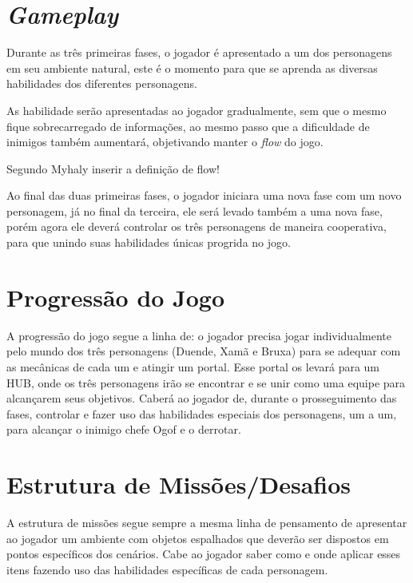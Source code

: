 \section{\textit{Gameplay}}

Durante as três primeiras fases, o jogador é apresentado a um dos personagens em seu ambiente natural, este é o momento para que se aprenda as diversas habilidades dos diferentes personagens.

As habilidade serão apresentadas ao jogador gradualmente, sem que o mesmo fique sobrecarregado de informações, ao mesmo passo que a dificuldade de inimigos também aumentará, objetivando manter o \textit{flow} do jogo.
\begin{citacao}
Segundo Myhaly inserir a definição de flow! \cite[74]{mihalyi2009}
\end{citacao}

Ao final das duas primeiras fases, o jogador iniciara uma nova fase com um novo personagem, já no  final da terceira, ele será levado também a uma nova fase, porém agora ele deverá controlar os três personagens de maneira cooperativa, para que unindo suas habilidades únicas progrida no jogo.


\section{Progressão do Jogo}

A progressão do jogo segue a linha de: o jogador precisa jogar individualmente pelo mundo dos três personagens (Duende, Xamã e Bruxa) para se adequar com as mecânicas de cada um e atingir um portal. Esse portal os levará para um HUB, onde os três personagens irão se encontrar e se unir como uma equipe para alcançarem seus objetivos. Caberá ao jogador de, durante o prosseguimento das fases, controlar e fazer uso das habilidades especiais dos personagens, um a um, para alcançar o inimigo chefe Ogof e o derrotar.

\section{Estrutura de Missões/Desafios}

A estrutura de missões segue sempre a mesma linha de pensamento de apresentar ao jogador um ambiente com objetos espalhados que deverão ser dispostos em pontos específicos dos cenários. Cabe ao jogador saber como e onde aplicar esses itens fazendo uso das habilidades específicas de cada personagem.

